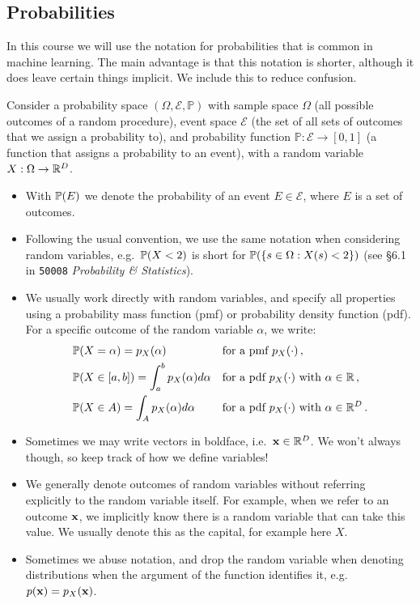 \documentclass[a4paper]{article}
\theoremstyle{definition}
\newcommand{\courseprobstats}{\texttt{50008} \textit{Probability \& Statistics}}
\begin{document}
\subsection{Probabilities}
In this course we will use the notation for probabilities that is common in machine learning. The main advantage is that this notation is shorter, although it does leave certain things implicit. We include this to reduce confusion.

Consider a probability space $(\Omega, \mathcal E, \mathbb P)$ with sample space $\Omega$ (all possible outcomes of a random procedure), event space $\mathcal E$ (the set of all sets of outcomes that we assign a probability to), and probability function $\mathbb P : \mathcal E \to [0, 1]$ (a function that assigns a probability to an event), with a random variable $X: \Omega \to \mathbb{R}^D$.
\begin{itemize}
\item With $\prob{E}$ we denote the probability of an event $E \in \mathcal E$, where $E$ is a set of outcomes.
\item Following the usual convention, we use the same notation when considering random variables, e.g.~$\prob{X < 2}$ is short for $\prob{\{s \in \Omega : X(s) < 2\}}$ (see \S6.1 in \courseprobstats).
\item We usually work directly with random variables, and specify all properties using a probability mass function (pmf) or probability density function (pdf). For a specific outcome of the random variable $\alpha$, we write:
\begin{align}
    &\prob{X=\alpha} = p_X(\alpha) && \text{for a pmf } p_X(\cdot) \,, \\
    &\prob{X \in [a, b]} = \int_a^b p_X(\alpha) d\alpha && \text{for a pdf $p_X(\cdot)$ with $\alpha \in \Reals$} \,, \\
    &\prob{X \in A} = \int_A p_X(\alpha) d\alpha && \text{for a pdf $p_X(\cdot)$ with $\alpha \in \Reals^D$}
    \,.
\end{align}
\item Sometimes we may write vectors in boldface, i.e.~$\mathbf x \in \mathbb{R}^D$. We won't always though, so keep track of how we define variables!
\item We generally denote outcomes of random variables without referring explicitly to the random variable itself. For example, when we refer to an outcome $\mathbf{x}$, we implicitly know there is a random variable that can take this value. We usually denote this as the capital, for example here $X$.
\item Sometimes we abuse notation, and drop the random variable when denoting distributions when the argument of the function identifies it, e.g.~$p(\mathbf{x}) = p_X(\mathbf{x})$.

\end{itemize}
\end{document}
